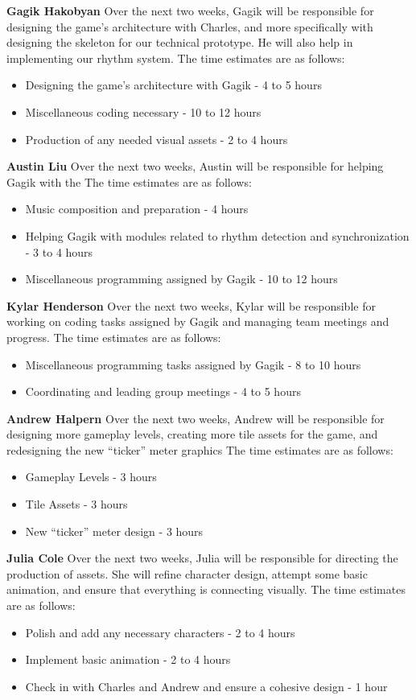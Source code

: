 \documentclass[]{article}
\begin{document}
\noindent
\textbf{Gagik Hakobyan}
Over the next two weeks, Gagik will be responsible for designing the
game’s architecture with Charles, and more specifically with designing
the skeleton for our technical prototype. He will also help in
implementing our rhythm system.
The time estimates are as follows:
\begin{itemize}
  \item Designing the game's architecture with Gagik - 4 to 5 hours
  \item Miscellaneous coding necessary - 10 to 12 hours
  \item Production of any needed visual assets - 2 to 4 hours
\end{itemize}

\noindent
\textbf{Austin Liu}
Over the next two weeks, Austin will be responsible for helping Gagik with the 
The time estimates are as follows:
\begin{itemize}
\item Music composition and preparation - 4 hours
\item Helping Gagik with modules related to rhythm detection 
  and synchronization - 3 to 4 hours 
\item Miscellaneous programming assigned by Gagik - 10 to 12 hours

\noindent
\end{itemize}
\textbf{Kylar Henderson}
Over the next two weeks, Kylar will be responsible for working on coding 
tasks assigned by Gagik and managing team meetings and progress. 
The time estimates are as follows:
\begin{itemize}
\item Miscellaneous programming tasks assigned by Gagik - 8 to 10 hours
\item Coordinating and leading group meetings - 4 to 5 hours
\end{itemize}

\noindent
\textbf{Andrew Halpern}
Over the next two weeks, Andrew will be responsible for designing more
gameplay levels, creating more tile assets for the game, and
redesigning the new ``ticker'' meter graphics
The time estimates are as follows:
\begin{itemize}
\item Gameplay Levels - 3 hours
\item Tile Assets - 3 hours
\item New ``ticker'' meter design - 3 hours
\end{itemize}

\noindent
\textbf{Julia Cole}
Over the next two weeks, Julia will be responsible for directing the 
production of assets. She will refine character design, attempt some 
basic animation, and ensure that everything is connecting visually.
The time estimates are as follows:
\begin{itemize}
\item Polish and add any necessary characters - 2 to 4 hours
\item Implement basic animation - 2 to 4 hours
\item Check in with Charles and Andrew and ensure a cohesive design - 1 hour
\end{itemize}
\end{document}
